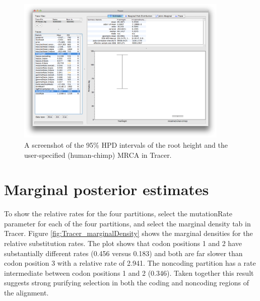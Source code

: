 \documentclass[11pt]{article}
\theoremstyle{plain}%
\theoremstyle{definition}
\theoremstyle{remark}
\begin{document}
\begin{figure}
\centering	
\includegraphics[width=0.9\textwidth]{figures/Tracer_divergences}
\caption{A screenshot of the 95\% HPD intervals of the root height and the user-specified (human-chimp) MRCA in Tracer.}
\label{fig:Tracer_divergences}
\end{figure}

\section{Marginal posterior estimates}

To show the relative rates for the four partitions, select the mutationRate parameter for each of the four partitions, and select the marginal density tab in Tracer.
Figure \ref{fig:Tracer_marginalDensity} shows the marginal densities for the relative substitution rates. The
plot shows that codon positions 1 and 2 have substantially different rates (0.456
versus 0.183) and both are far slower than codon position 3 with a relative rate of
2.941. The noncoding partition has a rate intermediate between codon positions
1 and 2 (0.346). Taken together this result suggests strong purifying selection in
both the coding and noncoding regions of the alignment.


\end{document}
